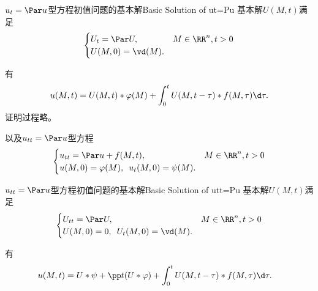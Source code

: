 \begin{definition}{$u_t=\Par u$型方程初值问题的基本解}{Basic Solution of ut=Pu}
	基本解$U(M,t)$满足
	\begin{align}
		\begin{cases}
			U_t=\Par U,&M\in\RR^n,t>0\\
			U(M,0)=\vd(M).
		\end{cases}
	\end{align}
\end{definition}
有
\begin{align}
	u(M,t)=U(M,t)\ast\varphi(M)+\int_0^tU(M,t-\tau)\ast f(M,\tau)\d\tau.
\end{align}
证明过程略。

以及$u_{tt}=\Par u$型方程
\begin{align}
	\begin{cases}
		u_{tt}=\Par u+f(M,t),&M\in\RR^n,t>0\\
		u(M,0)=\varphi(M),\enspace u_t(M,0)=\psi(M).
	\end{cases}
\end{align}
\begin{definition}{$u_{tt}=\Par u$型方程初值问题的基本解}{Basic Solution of utt=Pu}
	基本解$U(M,t)$满足
	\begin{align}
		\begin{cases}
			U_{tt}=\Par U,&M\in\RR^n,t>0\\
			U(M,0)=0,\enspace U_t(M,0)=\vd(M).
		\end{cases}
	\end{align}
\end{definition}
有
\begin{align}
	\begin{aligned}
		u(M,t)=&\;U\ast\psi+\pp t(U\ast\varphi)+\int_0^tU(M,t-\tau)\ast f(M,\tau)\d\tau.
	\end{aligned}
\end{align}
